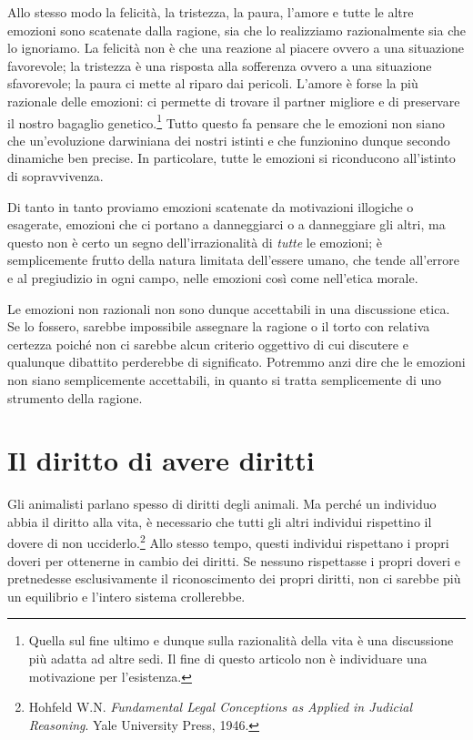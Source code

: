 \documentclass[a4paper,11pt,oneside,article]{memoir}
\begin{document}
Allo stesso modo la felicità, la tristezza, la paura, l'amore e tutte le altre
emozioni sono scatenate dalla ragione, sia che lo realizziamo razionalmente sia
che lo ignoriamo. La felicità non è che una reazione al piacere ovvero a una
situazione favorevole; la tristezza è una risposta alla sofferenza ovvero a una
situazione sfavorevole; la paura ci mette al riparo dai pericoli. L'amore è
forse la più razionale delle emozioni: ci permette di trovare il partner
migliore e di preservare il nostro bagaglio genetico.\footnote{Quella sul fine
ultimo e dunque sulla razionalità della vita è una discussione più adatta ad
altre sedi. Il fine di questo articolo non è individuare una motivazione per
l'esistenza.} Tutto questo fa pensare che le emozioni non siano che
un'evoluzione darwiniana dei nostri istinti e che funzionino dunque secondo
dinamiche ben precise. In particolare, tutte le emozioni si riconducono
all'istinto di sopravvivenza.

Di tanto in tanto proviamo emozioni scatenate da motivazioni illogiche o
esagerate, emozioni che ci portano a danneggiarci o a danneggiare gli altri, ma
questo non è certo un segno dell'irrazionalità di \emph{tutte} le emozioni; è
semplicemente frutto della natura limitata dell'essere umano, che tende
all'errore e al pregiudizio in ogni campo, nelle emozioni così come nell'etica
morale.

Le emozioni non razionali non sono dunque accettabili in una discussione etica.
Se lo fossero, sarebbe impossibile assegnare la ragione o il torto con relativa
certezza poiché non ci sarebbe alcun criterio oggettivo di cui discutere e
qualunque dibattito perderebbe di significato. Potremmo anzi dire che le
emozioni non siano semplicemente accettabili, in quanto si tratta semplicemente
di uno strumento della ragione.

\chapter{Il diritto di avere diritti}

Gli animalisti parlano spesso di diritti degli animali. Ma perché un individuo
abbia il diritto alla vita, è necessario che tutti gli altri individui
rispettino il dovere di non ucciderlo.\footnote{Hohfeld W.N. \emph{Fundamental
Legal Conceptions as Applied in Judicial Reasoning}. Yale University Press,
1946.} Allo stesso tempo, questi individui rispettano i propri doveri per
ottenerne in cambio dei diritti. Se nessuno rispettasse i propri doveri e
pretnedesse esclusivamente il riconoscimento dei propri diritti, non ci sarebbe
più un equilibrio e l'intero sistema crollerebbe.
\end{document}
